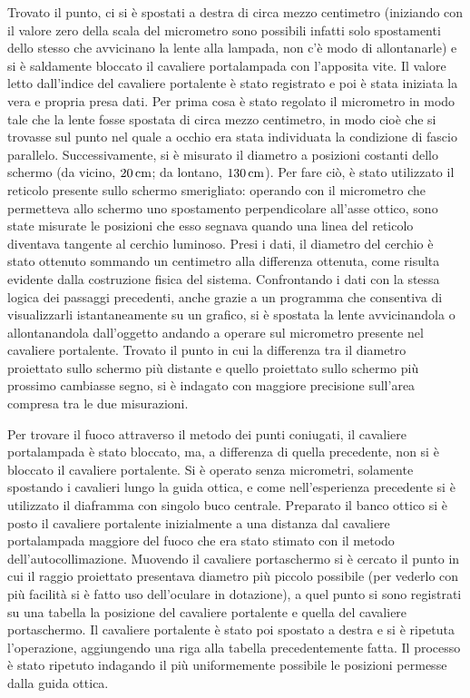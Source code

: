 Trovato il punto, ci si è spostati a destra di circa mezzo centimetro (iniziando con il 
valore zero della scala del micrometro sono possibili infatti solo 
spostamenti dello stesso che avvicinano la lente alla lampada, non 
c'è modo di allontanarle) e si è saldamente bloccato il cavaliere 
portalampada con l'apposita vite. Il valore letto dall'indice del 
cavaliere portalente è stato registrato e poi è stata iniziata la 
vera e propria presa dati. Per prima cosa è stato regolato il 
micrometro in modo tale che la lente fosse spostata di circa mezzo 
centimetro, in modo cioè che si trovasse sul punto nel quale a 
occhio era stata individuata la condizione di fascio parallelo. 
Successivamente, si è misurato il diametro a posizioni costanti 
dello schermo (da vicino, $20\,\mathrm{cm}$; da lontano, $130\,\mathrm{cm}$). Per fare 
ciò, è stato utilizzato il reticolo presente sullo schermo 
smerigliato: operando con il micrometro che permetteva allo schermo 
uno spostamento perpendicolare all'asse ottico, sono state misurate 
le posizioni che esso segnava quando una linea del reticolo 
diventava tangente al cerchio luminoso. Presi i dati, il diametro 
del cerchio \`e stato ottenuto sommando un centimetro alla 
differenza ottenuta, come risulta evidente dalla costruzione fisica 
del sistema. Confrontando i dati con la stessa logica dei passaggi 
precedenti, anche grazie a un programma che consentiva di 
visualizzarli istantaneamente su un grafico, si è spostata la lente 
avvicinandola o allontanandola dall'oggetto andando a operare sul 
micrometro presente nel cavaliere portalente. Trovato il punto in 
cui la differenza tra il diametro proiettato sullo schermo più 
distante e quello proiettato sullo schermo più prossimo cambiasse 
segno, si è indagato con maggiore precisione sull'area compresa tra 
le due misurazioni.

Per trovare il fuoco attraverso il metodo dei punti coniugati, il 
cavaliere portalampada \`e stato bloccato, ma, a differenza di 
quella precedente, non si è bloccato il cavaliere portalente. Si è 
operato senza micrometri, solamente spostando i cavalieri lungo la 
guida ottica, e come nell'esperienza precedente si è utilizzato il 
diaframma con singolo buco centrale. Preparato il banco ottico si è 
posto il cavaliere portalente inizialmente a una distanza dal 
cavaliere portalampada maggiore del fuoco che era stato stimato con 
il metodo dell'autocollimazione. Muovendo il cavaliere portaschermo 
si è cercato il punto in cui il raggio proiettato presentava 
diametro più piccolo possibile (per vederlo con più facilità si è 
fatto uso dell'oculare in dotazione), a quel punto si sono 
registrati su una tabella la posizione del cavaliere portalente e 
quella del cavaliere portaschermo. Il cavaliere portalente è stato 
poi spostato a destra e si è ripetuta l'operazione, aggiungendo una 
riga alla tabella precedentemente fatta. Il processo è stato 
ripetuto indagando il più uniformemente possibile le posizioni 
permesse dalla guida ottica.

